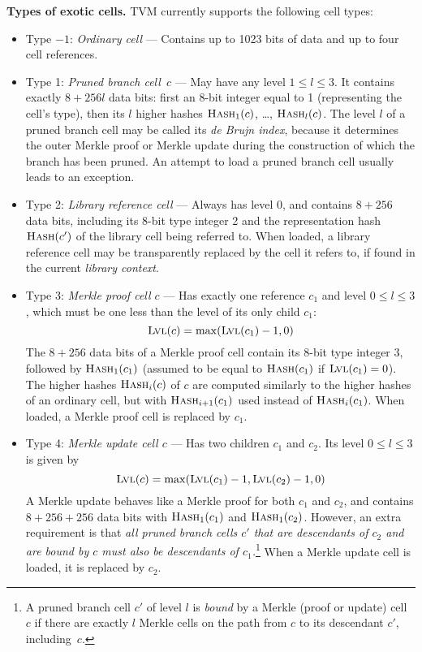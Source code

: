 \documentclass[12pt,oneside]{article}
\def\makepoint#1{\medbreak\noindent{\bf #1.\ }}
\def\nxsubpoint{\refstepcounter{subsubsection}%
    \smallbreak\makepoint{\thesubsubsection}}
\def\emb#1{\textbf{#1.}}
\def\opsc#1{\operatorname{\textsc{#1}}}
\def\Hash{\opsc{Hash}}
\def\Lvl{\opsc{Lvl}}
\begin{document}
    \nxsubpoint\label{sp:exotic.cell.types}\emb{Types of exotic cells}
    TVM currently supports the following cell types:
    \begin{itemize}
        \item Type $-1$: {\em Ordinary cell} --- Contains up to 1023 bits of data and up to four cell references.
        \item Type 1: {\em Pruned branch cell~$c$} --- May have any level $1\leq l\leq 3$. It contains exactly $8+256l$ data bits: first an 8-bit integer equal to 1 (representing the cell's type), then its $l$ higher hashes $\Hash_1(c)$, \dots, $\Hash_l(c)$. The level $l$ of a pruned branch cell may be called its {\em de Brujn index}, because it determines the outer Merkle proof or Merkle update during the construction of which the branch has been pruned. An attempt to load a pruned branch cell usually leads to an exception.
        \item Type 2: {\em Library reference cell} --- Always has level 0, and contains $8+256$ data bits, including its 8-bit type integer 2 and the representation hash $\Hash(c')$ of the library cell being referred to. When loaded, a library reference cell may be transparently replaced by the cell it refers to, if found in the current {\em library context}.
        \item Type 3: {\em Merkle proof cell $c$} --- Has exactly one reference $c_1$ and level $0\leq l\leq 3$, which must be one less than the level of its only child $c_1$:
        \begin{equation}
            \Lvl(c)=\max(\Lvl(c_1)-1,0)
        \end{equation}
        The $8+256$ data bits of a Merkle proof cell contain its 8-bit type integer 3, followed by $\Hash_1(c_1)$ (assumed to be equal to $\Hash(c_1)$ if $\Lvl(c_1)=0$). The higher hashes $\Hash_i(c)$ of $c$ are computed similarly to the higher hashes of an ordinary cell, but with $\Hash_{i+1}(c_1)$ used instead of $\Hash_i(c_1)$. When loaded, a Merkle proof cell is replaced by $c_1$.
        \item Type 4: {\em Merkle update cell $c$} --- Has two children $c_1$ and $c_2$. Its level $0\leq l\leq 3$ is given by
        \begin{equation}
            \Lvl(c)=\max(\Lvl(c_1)-1,\Lvl(c_2)-1,0)
        \end{equation}
        A Merkle update behaves like a Merkle proof for both $c_1$ and $c_2$, and contains $8+256+256$ data bits with $\Hash_1(c_1)$ and $\Hash_1(c_2)$. However, an extra requirement is that {\em all pruned branch cells $c'$ that are descendants of $c_2$ and are bound by $c$ must also be descendants of $c_1$.}\footnote{A pruned branch cell $c'$ of level $l$ is {\em bound\/} by a Merkle (proof or update) cell $c$ if there are exactly $l$ Merkle cells on the path from $c$ to its descendant $c'$, including~$c$.} When a Merkle update cell is loaded, it is replaced by $c_2$.
    \end{itemize}
\end{document}
